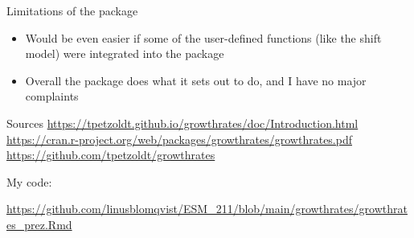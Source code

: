 \documentclass[
  ignorenonframetext,
]{beamer}
\providecommand{\tightlist}{%
  \setlength{\itemsep}{0pt}\setlength{\parskip}{0pt}}
\begin{document}
\begin{frame}{Limitations of the package}
\protect\hypertarget{limitations-of-the-package}{}
\begin{itemize}
\tightlist
\item
  Would be even easier if some of the user-defined functions (like the
  shift model) were integrated into the package
\item
  Overall the package does what it sets out to do, and I have no major
  complaints
\end{itemize}
\end{frame}

\begin{frame}{Sources}
\protect\hypertarget{sources}{}
\url{https://tpetzoldt.github.io/growthrates/doc/Introduction.html}
\url{https://cran.r-project.org/web/packages/growthrates/growthrates.pdf}
\url{https://github.com/tpetzoldt/growthrates}

My code:

\url{https://github.com/linusblomqvist/ESM_211/blob/main/growthrates/growthrates_prez.Rmd}
\end{frame}
\end{document}
